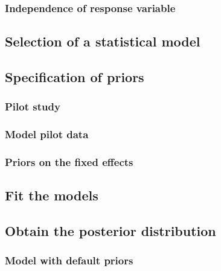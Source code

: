 \documentclass[
]{book}
\begin{document}
\hypertarget{bern-depend}{%
\subsubsection{Independence of response variable}\label{bern-depend}}

\hypertarget{bern-select}{%
\subsection{Selection of a statistical model}\label{bern-select}}

\hypertarget{bern-prior-spec}{%
\subsection{Specification of priors}\label{bern-prior-spec}}

\hypertarget{pilot-study}{%
\subsubsection{Pilot study}\label{pilot-study}}

\hypertarget{model-pilot-data}{%
\subsubsection{Model pilot data}\label{model-pilot-data}}

\hypertarget{bern-priors-fixed}{%
\subsubsection{Priors on the fixed effects}\label{bern-priors-fixed}}

\hypertarget{bern-fit-models}{%
\subsection{Fit the models}\label{bern-fit-models}}

\hypertarget{bern-post-dist}{%
\subsection{Obtain the posterior distribution}\label{bern-post-dist}}

\hypertarget{model-with-default-priors-1}{%
\subsubsection{Model with default
priors}\label{model-with-default-priors-1}}
\end{document}
